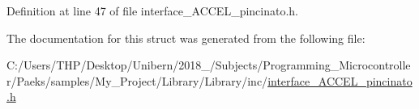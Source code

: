 Definition at line 47 of file interface\+\_\+\+A\+C\+C\+E\+L\+\_\+pincinato.\+h.



The documentation for this struct was generated from the following file\+:\begin{DoxyCompactItemize}
\item 
C\+:/\+Users/\+T\+H\+P/\+Desktop/\+Unibern/2018\+\_/\+Subjects/\+Programming\+\_\+\+Microcontroller/\+Paeks/samples/\+My\+\_\+\+Project/\+Library/\+Library/inc/\mbox{\hyperlink{interface___a_c_c_e_l__pincinato_8h}{interface\+\_\+\+A\+C\+C\+E\+L\+\_\+pincinato.\+h}}\end{DoxyCompactItemize}
